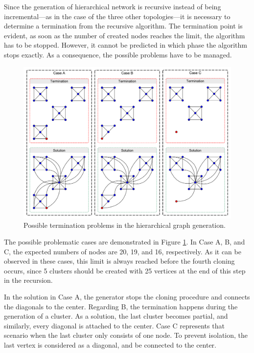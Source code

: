 Since the generation of hierarchical network is recursive instead of being incremental---as in the case of the three other topologies---it is necessary to determine a termination from the recursive algorithm. The termination point is evident, as soon as the number of created nodes reaches the limit, the algorithm has to be stopped. However, it cannot be predicted in which phase the algorithm stops exactly. As a consequence, the possible problems have to be managed.

\begin{figure}[!ht]
	\centering
	\includegraphics[width=150mm, keepaspectratio]{figures/hierarchical.pdf}
	\caption{Possible termination problems in the hierarchical graph generation.}
	\label{fig:hierarchical_problems}
\end{figure}

The possible problematic cases are demonstrated in Figure \ref{fig:hierarchical_problems}. In \textsf{Case A}, \textsf{B}, and \textsf{C}, the expected numbers of nodes are 20, 19, and 16, respectively. As it can be observed in these cases, this limit is always reached before the fourth cloning occurs, since 5 clusters should be created with 25 vertices at the end of this step in the recursion.

In the solution in \textsf{Case A}, the generator stops the cloning procedure and connects the diagonals to the center. Regarding \textsf{B}, the termination happens during the generation of a cluster. As a solution, the last cluster becomes partial, and similarly, every diagonal is attached to the center. \textsf{Case C} represents that scenario when the last cluster only consists of one node. To prevent isolation, the last vertex is considered as a diagonal, and be connected to the center.

